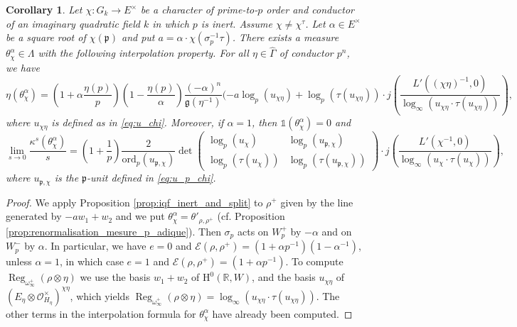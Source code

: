 \documentclass[12pt]{amsart}
\newcommand\bR{\mathbb{R}}
\newcommand\cE{\mathcal{E}}
\newcommand\cO{\mathcal{O}}
\newcommand\g{\mathfrak{g}}
\newcommand\gp{\mathfrak{p}}
\newcommand{\ord}{\mathrm{ord}}
\DeclareMathOperator{\Reg}{Reg}
\newcommand{\HH}{\mathrm{H}}
\theoremstyle{defstyle}
\theoremstyle{thmstyle}
\newtheorem{corollaire}[subsubsection]{Corollary}
\begin{document}
\begin{corollaire}\label{coro:formule_theta_p_inerte}
	Let $\chi:G_k\longrightarrow E^\times$ be a character of prime-to-$p$ order and conductor of an imaginary quadratic field $k$ in which $p$ is inert. Assume $\chi\neq \chi^\tau$. Let $\alpha\in E^\times$ be a square root of $\chi(\gp)$ and put $a=\alpha\cdot\chi(\sigma_p^{-1}\tau)$. There exists a measure $\theta^\alpha_\chi\in\Lambda$ with the following interpolation property. For all $\eta\in\widehat{\Gamma}$ of conductor $p^n$, we have
	\[\eta(\theta^\alpha_\chi)= \left(1+\alpha\frac{\eta(p)}{p}\right)\left(1-\frac{\eta(p)}{\alpha}\right)\frac{(-\alpha)^n}{\g(\eta^{-1})}(-a\log_p(u_{\chi\eta})+\log_p(\tau(u_{\chi\eta}))\cdot j\left(\frac{L'((\chi\eta)^{-1},0)}{\log_\infty(u_{\chi\eta}\cdot \tau(u_{\chi\eta}))}\right), \]
	where $u_{\chi\eta}$ is defined as in \eqref{eq:u_chi}. Moreover, if $\alpha=1$, then $\mathds{1}(\theta^\alpha_\chi)=0$ and
	\[\lim_{s\rightarrow 0}\frac{\kappa^s(\theta^\alpha_\chi)}{s}=\left(1+\frac{1}{p}\right)\frac{2}{\ord_p(u_{\gp,\chi})}\det\begin{pmatrix}\log_p(u_\chi) & \log_p(u_{{\gp},\chi}) \\ \log_p(\tau(u_{\chi})) & \log_p(\tau(u_{{\gp},\chi}))\end{pmatrix}\cdot j\left(\frac{L'(\chi^{-1},0)}{\log_\infty(u_{\chi}\cdot \tau(u_{\chi}))}\right), \]
	where $u_{{\gp},\chi}$ is the $\gp$-unit defined in \eqref{eq:u_p_chi}.
\end{corollaire}
\begin{proof}
	We apply Proposition \ref{prop:iqf_inert_and_split} to $\rho^+$ given by the line generated by $-aw_1+w_2$ and we put $\theta^\alpha_\chi=\theta'_{\rho,\rho^+}$ (cf. Proposition \ref{prop:renormalisation_mesure_p_adique}). Then $\sigma_p$ acts on $W_p^+$ by $-\alpha$ and on $W_p^-$ by $\alpha$. In particular, we have $e=0$ and $\cE(\rho,\rho^+)=(1+\alpha p^{-1})(1-\alpha^{-1})$, unless $\alpha=1$, in which case $e=1$ and $\cE(\rho,\rho^+)=(1+\alpha p^{-1})$. To compute $\Reg_{\omega_{\infty}^+}(\rho\otimes\eta)$ we use the basis $w_1+w_2$ of $\HH^0(\bR,W)$, and the basis $u_{\chi\eta}$ of $(E_\eta\otimes \cO_{H_\eta}^\times)^{\chi\eta}$, which yields $\Reg_{\omega_{\infty}^+}(\rho\otimes\eta)=\log_\infty(u_{\chi\eta}\cdot \tau(u_{\chi\eta}))$. The other terms in the interpolation formula for $\theta^\alpha_\chi$ have already been computed. 
\end{proof}
 
\end{document}
